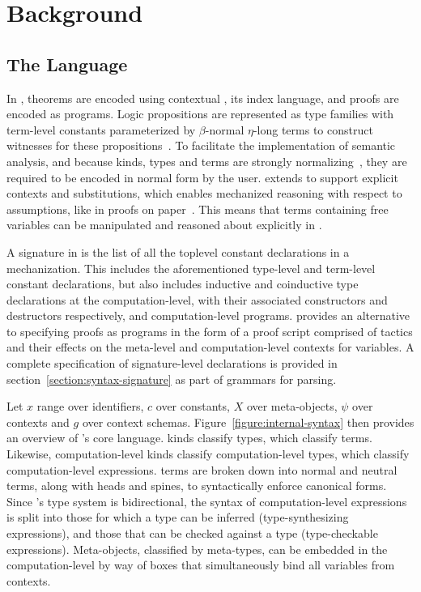 \chapter{Background}

\section{The \Beluga Language}

In \Beluga, theorems are encoded using contextual \LF, its index language, and proofs are encoded as programs.
Logic propositions are represented as \LF type families with term-level constants parameterized by $\beta$-normal $\eta$-long \LF terms to construct witnesses for these propositions~\cite{nanevski2008contextual, foundation2008pientka, DBLP:journals/corr/abs-1009-2789}.
To facilitate the implementation of semantic analysis, and because \LF kinds, types and terms are strongly normalizing~\cite{harper1993framework}, they are required to be encoded in normal form by the user.
\Beluga extends \LF to support explicit contexts and substitutions, which enables mechanized reasoning with respect to assumptions, like in proofs on paper~\cite{pientka2010programming}.
This means that terms containing free variables can be manipulated and reasoned about explicitly in \Beluga.

A signature in \Beluga is the list of all the toplevel constant declarations in a mechanization.
This includes the aforementioned \LF type-level and term-level constant declarations, but also includes inductive and coinductive type declarations at the computation-level, with their associated constructors and destructors respectively, and computation-level programs.
\Harpoon provides an alternative to specifying proofs as programs in the form of a proof script comprised of tactics and their effects on the meta-level and computation-level contexts for variables.
A complete specification of signature-level declarations is provided in section~\ref{section:syntax-signature} as part of grammars for parsing.


Let $x$ range over identifiers, $c$ over constants, $X$ over meta-objects, $\psi$ over contexts and $g$ over context schemas.
Figure~\ref{figure:internal-syntax} then provides an overview of \Beluga's core language.
\LF kinds classify \LF types, which classify \LF terms.
Likewise, computation-level kinds classify computation-level types, which classify computation-level expressions.
\LF terms are broken down into normal and neutral terms, along with heads and spines, to syntactically enforce canonical forms.
Since \Beluga's type system is bidirectional, the syntax of computation-level expressions is split into those for which a type can be inferred (type-synthesizing expressions), and those that can be checked against a type (type-checkable expressions).
Meta-objects, classified by meta-types, can be embedded in the computation-level by way of boxes that simultaneously bind all variables from \LF contexts.

